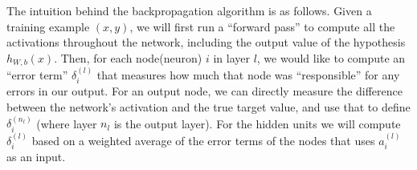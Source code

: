 \documentclass[11pt]{article} %
\begin{document}
\begin{displayquote}
The intuition behind the backpropagation algorithm is as follows. Given a training example $(x,y)$, we will first run a “forward pass” to compute all the activations throughout the network, including the output value of the hypothesis  $h_{W,b}(x)$. Then, for each node(neuron) $i$ in layer $l$, we would like to compute an “error term”  $\delta_i^{(l)}$ that measures how much that node was “responsible” for any errors in our output. For an output node, we can directly measure the difference between the network’s activation and the true target value, and use that to define $\delta_i^{(n_l)}$ (where layer $n_l$ is the output layer). For the hidden units we will compute $\delta_i^{(l)}$ based on a weighted average of the error terms of the nodes that uses $a^{(l)}_i$ as an input.
\end{displayquote}
\end{document}

